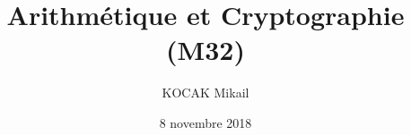\documentclass[final]{article}
\title{Arithmétique et Cryptographie (M32)}
\author{KOCAK Mikail}
\date{8 novembre 2018}
\begin{document}
    \begin{titlingpage}
        \maketitle
        \tableofcontents
    \end{titlingpage}
    
    
    
    
\end{document}
